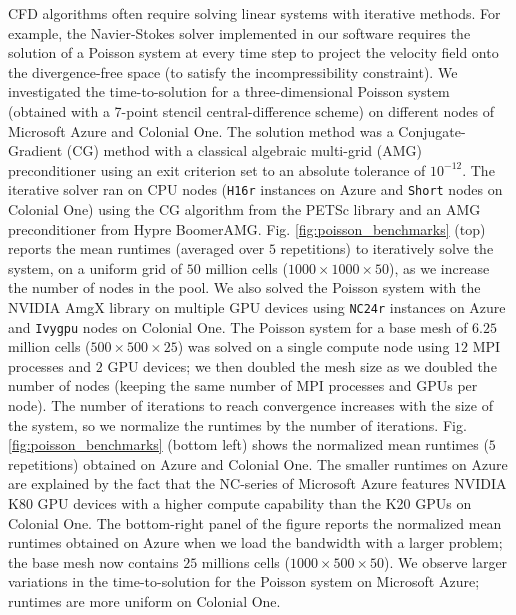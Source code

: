 \documentclass[10pt,journal,compsoc]{IEEEtran}
\begin{document}
CFD algorithms often require solving linear systems with iterative methods.
For example, the Navier-Stokes solver implemented in our software requires the solution of a Poisson system at every time step to project the velocity field onto the divergence-free space (to satisfy the incompressibility constraint).
We investigated the time-to-solution for a three-dimensional Poisson system (obtained with a 7-point stencil central-difference scheme) on different nodes of Microsoft Azure and Colonial One.
The solution method was a Conjugate-Gradient (CG) method with a classical algebraic multi-grid (AMG) preconditioner using an exit criterion set to an absolute tolerance of $10^{-12}$.
The iterative solver ran on CPU nodes (\texttt{H16r} instances on Azure and \texttt{Short} nodes on Colonial One) using the CG algorithm from the PETSc library\cite{balay_et_al_2018} and an AMG preconditioner from Hypre BoomerAMG.
Fig. \ref{fig:poisson_benchmarks} (top) reports the mean runtimes (averaged over $5$ repetitions) to iteratively solve the system, on a uniform grid of $50$ million cells ($1000 \times 1000 \times 50$), as we increase the number of nodes in the pool.
We also solved the Poisson system with the NVIDIA AmgX library on multiple GPU devices using \texttt{NC24r} instances on Azure and \texttt{Ivygpu} nodes on Colonial One.
The Poisson system for a base mesh of $6.25$ million cells ($500 \times 500 \times 25$) was solved on a single compute node using $12$ MPI processes and $2$ GPU devices; we then doubled the mesh size as we doubled the number of nodes (keeping the same number of MPI processes and GPUs per node).
The number of iterations to reach convergence increases with the size of the system, so we normalize the runtimes by the number of iterations.
Fig. \ref{fig:poisson_benchmarks} (bottom left) shows the normalized mean runtimes ($5$ repetitions) obtained on Azure and Colonial One.
The smaller runtimes on Azure are explained by the fact that the NC-series of Microsoft Azure features NVIDIA K80 GPU devices with a higher compute capability than the K20 GPUs on Colonial One.
The bottom-right panel of the figure reports the normalized mean runtimes obtained on Azure when we load the bandwidth with a larger problem; the base mesh now contains $25$ millions cells ($1000 \times 500 \times 50$).
We observe larger variations in the time-to-solution for the Poisson system on Microsoft Azure; runtimes are more uniform on Colonial One.
\end{document}
